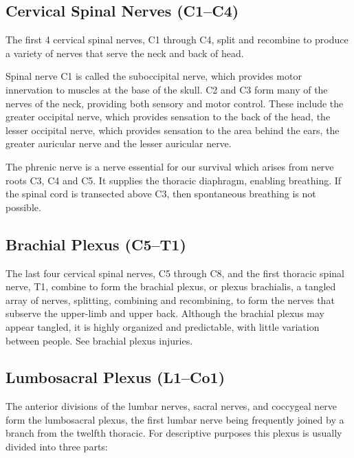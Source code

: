 \hypertarget{cervical-spinal-nerves-c1c4}{%
\subsection{Cervical Spinal Nerves (C1--C4)}\label{cervical-spinal-nerves-c1c4}}

The first 4 cervical spinal nerves, C1 through C4, split and recombine to produce a variety of nerves that serve the neck and back of head.

Spinal nerve C1 is called the suboccipital nerve, which provides motor innervation to muscles at the base of the skull. C2 and C3 form many of the nerves of the neck, providing both sensory and motor control. These include the greater occipital nerve, which provides sensation to the back of the head, the lesser occipital nerve, which provides sensation to the area behind the ears, the greater auricular nerve and the lesser auricular nerve.

The phrenic nerve is a nerve essential for our survival which arises from nerve roots C3, C4 and C5. It supplies the thoracic diaphragm, enabling breathing. If the spinal cord is transected above C3, then spontaneous breathing is not possible.

\hypertarget{brachial-plexus-c5t1}{%
\subsection{Brachial Plexus (C5--T1)}\label{brachial-plexus-c5t1}}

The last four cervical spinal nerves, C5 through C8, and the first thoracic spinal nerve, T1, combine to form the brachial plexus, or plexus brachialis, a tangled array of nerves, splitting, combining and recombining, to form the nerves that subserve the upper-limb and upper back. Although the brachial plexus may appear tangled, it is highly organized and predictable, with little variation between people. See brachial plexus injuries.

\hypertarget{lumbosacral-plexus-l1co1}{%
\subsection{Lumbosacral Plexus (L1--Co1)}\label{lumbosacral-plexus-l1co1}}

The anterior divisions of the lumbar nerves, sacral nerves, and coccygeal nerve form the lumbosacral plexus, the first lumbar nerve being frequently joined by a branch from the twelfth thoracic. For descriptive purposes this plexus is usually divided into three parts:

